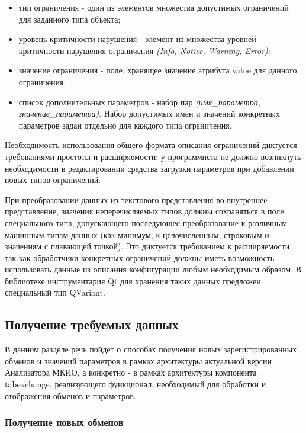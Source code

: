 \begin{itemize}
 \item тип ограничения - один из элементов множества допустимых ограничений для 
заданного типа объекта;
 \item уровень критичности нарушения - элемент из множества уровней критичности 
нарушения ограничения \textit{(Info, Notice, Warning, Error)};
 \item значение ограничения - поле, хранящее значение атрибута value для 
данного ограничения;
 \item список дополнительных параметров - набор пар \textit{(имя\_параметра, 
значение\_параметра)}. Набор допустимых имён и значений конкретных параметров 
задан отдельно для каждого типа ограничения.
\end{itemize}

Необходимость использования общего формата описания ограничений диктуется 
требованиями простоты и расширяемости: у программиста не должно возникнуть 
необходимости в редактировании средства загрузки параметров при добавлении 
новых типов ограничений.

При преобразовании данных из текстового представления во внутреннее 
представление, значения неперечисляемых типов должны сохраняться в поле 
специального типа, допускающего последующее преобразование к различным машинным 
типам данных (как минимум, к целочисленным, строковым и значениям с плавающей 
точкой). Это диктуется требованием к расширяемости, так как обработчики 
конкретных ограничений должны иметь возможность использовать данные из описания 
конфигурации любым необходимым образом. В библиотеке инструментария Qt для 
хранения таких данных предложен специальный тип QVariant.

\subsection{Получение требуемых данных}

В данном разделе речь пойдёт о способах получения новых зарегистрированных 
обменов и значений параметров в рамках архитектуры актуальной версии 
Анализатора МКИО, а конкретно - в рамках архитектуры компонента tabexchange, 
реализующего функционал, необходимый для обработки и отображения обменов и 
параметров.

\subsubsection{Получение новых обменов}

